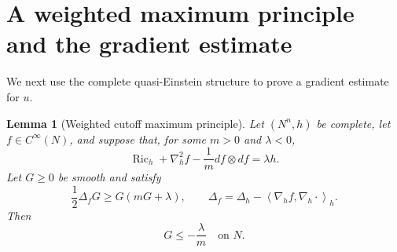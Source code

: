 \documentclass[11pt]{amsart}
\numberwithin{equation}{section}
\newtheorem{lemma}[theorem]{Lemma}
\DeclareMathOperator{\Ric}{Ric}
\newcommand{\Hess}{\nabla^2}
\newcommand{\ip}[2]{\left\langle #1,#2\right\rangle}
\begin{document}
\section{A weighted maximum principle and the gradient estimate}\label{sec:maprinciple}

We next use the complete quasi-Einstein structure to prove a gradient estimate for $u$.

\begin{lemma}[Weighted cutoff maximum principle]\label{lem:weightedMP}
Let $(N^n,h)$ be complete, let $f\in C^\infty(N)$, and suppose that, for some $m>0$ and $\lambda<0$,
\begin{equation}\label{Ricfm-lower}
        \Ric_h+\Hess_h f-\frac1m df\otimes df=\lambda h .
\end{equation}
Let $G\geq0$ be smooth and satisfy
\begin{equation}\label{Gineq}
        \frac12\Delta_f G\geq G(mG+\lambda),
        \qquad
        \Delta_f=\Delta_h-\ip{\nabla_h f}{\nabla_h\cdot}_h .
\end{equation}
Then
\begin{equation}\label{GboundMP}
        G\leq -\frac{\lambda}{m}\quad\text{on }N .
\end{equation}
\end{lemma}
\end{document}
